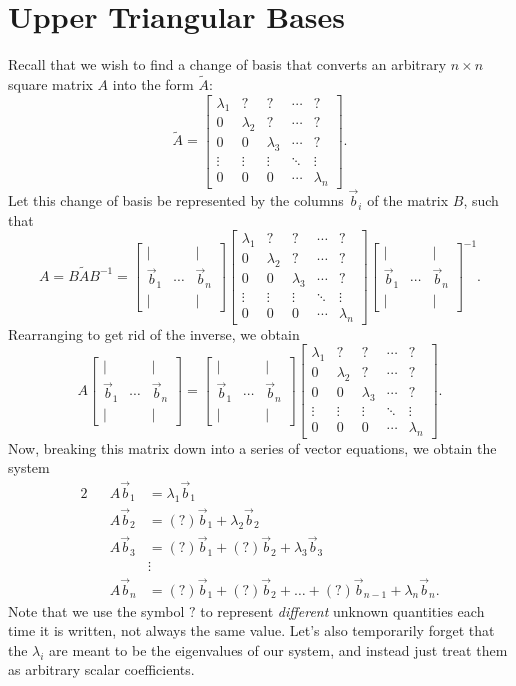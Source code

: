 \documentclass[letterpaper]{article}
\theoremstyle{remark}
\renewcommand{\tilde}[1]{\widetilde{#1}}
\newcommand{\mat}[1]{\ensuremath{\begin{bmatrix}#1\end{bmatrix}}}
\newcommand{\eqn}[1]{\begin{alignat*}{2}#1\end{alignat*}}
\begin{document}
\section{Upper Triangular Bases}
Recall that we wish to find a change of basis that converts an arbitrary $n\times n$ square matrix $A$ into the form $\tilde{A}$:
\[
    \tilde{A} = \mat{
    \lambda_1 & ? & ? & \cdots & ? \\ 
    0 & \lambda_2 & ? & \cdots & ? \\
    0 & 0 & \lambda_3 & \cdots & ? \\
    \vdots & \vdots & \vdots & \ddots & \vdots \\
    0 & 0 & 0 & \cdots & \lambda_n}.
\]
Let this change of basis be represented by the columns $\vec{b}_i$ of the matrix $B$, such that
\[
    A = B\tilde{A}B^{-1} = \mat{| & & | \\ \vec{b}_1 & \cdots & \vec{b}_n \\ | & & |}\mat{
    \lambda_1 & ? & ? & \cdots & ? \\ 
    0 & \lambda_2 & ? & \cdots & ? \\
    0 & 0 & \lambda_3 & \cdots & ? \\
    \vdots & \vdots & \vdots & \ddots & \vdots \\
    0 & 0 & 0 & \cdots & \lambda_n}\mat{| & & | \\ \vec{b}_1 & \cdots & \vec{b}_n \\ | & & |}^{-1}.
\]
Rearranging to get rid of the inverse, we obtain
\[
    A\mat{| & & | \\ \vec{b}_1 & \cdots & \vec{b}_n \\ | & & |} = \mat{| & & | \\ \vec{b}_1 & \cdots & \vec{b}_n \\ | & & |}\mat{
    \lambda_1 & ? & ? & \cdots & ? \\ 
    0 & \lambda_2 & ? & \cdots & ? \\
    0 & 0 & \lambda_3 & \cdots & ? \\
    \vdots & \vdots & \vdots & \ddots & \vdots \\
    0 & 0 & 0 & \cdots & \lambda_n}.
\]
Now, breaking this matrix down into a series of vector equations, we obtain the system
\eqn{
    && A\vec{b}_1 &= \lambda_1 \vec{b}_1 \\
    && A\vec{b}_2 &= (?)\vec{b}_1 + \lambda_2 \vec{b}_2 \\
    && A\vec{b}_3 &= (?)\vec{b}_1 + (?)\vec{b}_2 + \lambda_3 \vec{b}_3 \\
    &&& \vdots \\
    && A\vec{b}_n &= (?)\vec{b}_1 + (?)\vec{b}_2 + \ldots +  (?)\vec{b}_{n-1} + \lambda_n \vec{b}_n.
}
Note that we use the symbol $?$ to represent \emph{different} unknown quantities each time it is written, not always the same value. Let's also temporarily forget that the $\lambda_i$ are meant to be the eigenvalues of our system, and instead just treat them as arbitrary scalar coefficients.
\end{document}
